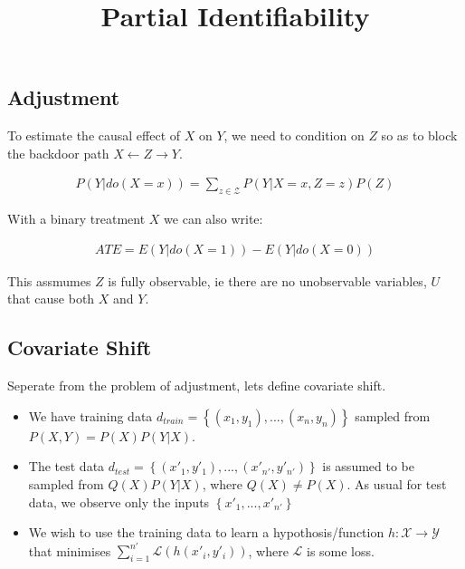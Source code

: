\documentclass{article}
\title{Partial Identifiability}
\newcommand{\set}[1]{\left\{#1\right\}}
\newcommand{\eq}[1]{\begin{align*}#1\end{align*}}
\theoremstyle{plain}
\theoremstyle{definition}
\begin{document}
\def\ci{\perp\!\!\!\perp}

\subsection*{Adjustment}

\begin{figure}[H]
	\centering    
\end{figure}

To estimate the causal effect of $X$ on $Y$, we need to condition on $Z$ so as to block the backdoor path $X \leftarrow Z \rightarrow Y$. 

\eq {
P(Y|do(X=x)) = \sum_{z \in \mathcal{Z}}P(Y|X=x,Z=z)P(Z)
}

With a binary treatment $X$ we can also write:

\eq{
ATE = E(Y|do(X=1)) - E(Y|do(X=0))
}

This assmumes $Z$ is fully observable, ie there are no unobservable variables, $U$ that cause both $X$ and $Y$. 

\subsection*{Covariate Shift}

Seperate from the problem of adjustment, lets define covariate shift.

\begin{itemize}
\item We have training data $d_{train} = \set{(x_1,y_1),...,(x_n,y_n)}$ sampled from $P(X,Y) = P(X)P(Y|X)$.
\item The test data $d_{test} = \set{(x'_1,y'_1),...,(x'_{n'},y'_{n'})}$ is assumed to be sampled from $Q(X)P(Y|X)$, where $Q(X) \neq P(X)$. As usual for test data, we observe only the inputs $\set{x'_1,...,x'_{n'}}$
\item We wish to use the training data to learn a hypothosis/function $h:\mathcal{X} \rightarrow \mathcal{Y}$ that minimises $\sum_{i = 1}^{n'}\mathcal{L}(h(x'_i,y'_i))$, where $\mathcal{L}$ is some loss.
\end{itemize}
\end{document}
